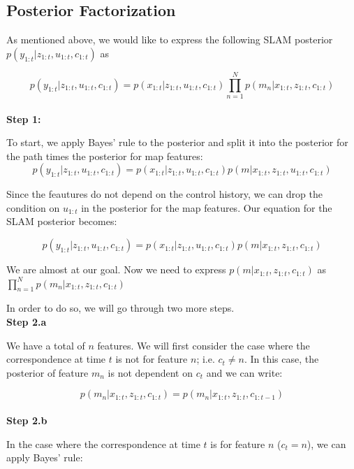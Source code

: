 \documentclass[twoside]{article}
\begin{document}
\subsection{Posterior Factorization}
As mentioned above, we would like to express the following SLAM posterior $p(y_{1:t}|z_{1:t},u_{1:t},c_{1:t})$ as

\begin{equation}
p(y_{1:t}|z_{1:t},u_{1:t},c_{1:t}) = p(x_{1:t}|z_{1:t},u_{1:t},c_{1:t})\prod_{n=1}^Np(m_n|x_{1:t},z_{1:t},c_{1:t})\nonumber
\end{equation}
\\

\textbf{Step 1:}

To start, we apply Bayes' rule to the posterior and split it into the posterior for the path times the posterior for map features:
\begin{equation}
p(y_{1:t}|z_{1:t},u_{1:t},c_{1:t}) = p(x_{1:t}|z_{1:t},u_{1:t},c_{1:t})p(m|x_{1:t},z_{1:t},u_{1:t},c_{1:t})
\end{equation}

Since the feautures do not depend on the control history, we can drop the condition on $u_{1:t}$ in the posterior for the map features. Our equation for the SLAM posterior becomes:

\begin{equation}
p(y_{1:t}|z_{1:t},u_{1:t},c_{1:t}) = p(x_{1:t}|z_{1:t},u_{1:t},c_{1:t})p(m|x_{1:t},z_{1:t},c_{1:t})
\end{equation}

We are almost at our goal. Now we need to express $p(m|x_{1:t},z_{1:t},c_{1:t})$ as $\prod_{n=1}^Np(m_n|x_{1:t},z_{1:t},c_{1:t})\nonumber$

In order to do so, we will go through two more steps.
\\

\textbf{Step 2.a}

We have a total of $n$ features. We will first consider the case where the correspondence at time $t$ is not for feature $n$; i.e. $c_t \neq n$. In this case, the posterior of feature $m_n$ is not dependent on $c_t$ and we can write:

\begin{equation}
p(m_n|x_{1:t},z_{1:t},c_{1:t}) = p(m_n|x_{1:t},z_{1:t},c_{1:t-1})
\end{equation}
\\

\textbf{Step 2.b}

In the case where the correspondence at time $t$ is for feature $n$ ($c_t = n$), we can apply Bayes' rule:
\end{document}
